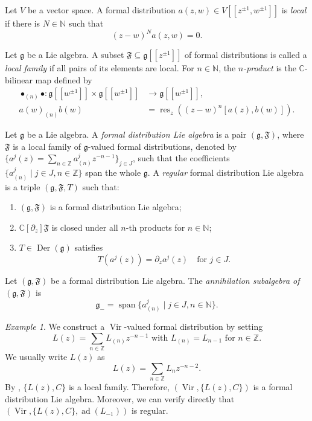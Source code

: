 \documentclass[a4paper, 12pt, reqno]{amsart}
\theoremstyle{remark}
\newtheorem{example}[theorem]{Example}
\DeclareMathOperator{\Vir}{Vir}
\DeclareMathOperator{\vspan}{span}
\DeclareMathOperator{\ad}{ad}
\DeclareMathOperator{\res}{res}
\DeclareMathOperator{\Der}{Der}
\begin{document}
Let $V$ be a vector space.
A formal distribution $a(z, w) \in V[[z^{\pm1}, w^{\pm1}]]$ is \emph{local} if there is $N \in \mathbb{N}$ such that
\begin{equation*}
  (z - w)^Na(z, w) = 0.
\end{equation*}

Let $\mathfrak{g}$ be a Lie algebra.
A subset $\mathfrak{F} \subseteq \mathfrak{g}[[z^{\pm1}]]$ of formal distributions is called a \emph{local family} if all pairs of its elements are local.
For $n \in \mathbb{N}$, the \emph{$n$-product} is the $\mathbb{C}$-bilinear map defined by
\begin{align*}
  \bullet_{(n)}\bullet: \mathfrak{g}[[w^{\pm1}]] \times \mathfrak{g}[[w^{\pm1}]] &\to \mathfrak{g}[[w^{\pm1}]], \\
  a(w)_{(n)}b(w) &= \res_z((z - w)^n[a(z), b(w)]).
\end{align*}

Let $\mathfrak{g}$ be a Lie algebra.
A \emph{formal distribution Lie algebra} is a pair $(\mathfrak{g}, \mathfrak{F})$, where $\mathfrak{F}$ is a local family of $\mathfrak{g}$-valued formal distributions, denoted by $\{a^j(z) = \sum_{n \in \mathbb{Z}}a^j_{(n)}z^{-n - 1}\}_{j \in J}$, such that the coefficients $\{a^j_{(n)} \mid j \in J, n \in \mathbb{Z}\}$ span the whole $\mathfrak{g}$.
A \emph{regular} formal distribution Lie algebra is a triple $(\mathfrak{g}, \mathfrak{F}, T)$ such that:
\begin{enumerate}
\item $(\mathfrak{g}, \mathfrak{F})$ is a formal distribution Lie algebra;
\item $\mathbb{C}[\partial_z]\mathfrak{F}$ is closed under all $n$-th products for $n \in \mathbb{N}$;
\item $T \in \Der(\mathfrak{g})$ satisfies
  \begin{equation*}
    T(a^j(z)) = \partial_za^j(z) \quad \text{for $j \in J$}.
  \end{equation*}
\end{enumerate}

Let $(\mathfrak{g}, \mathfrak{F})$ be a formal distribution Lie algebra.
The \emph{annihilation subalgebra of $(\mathfrak{g}, \mathfrak{F})$} is
\begin{equation*}
  \mathfrak{g}_- = \vspan\{a^j_{(n)} \mid j \in J, n \in \mathbb{N}\}.
\end{equation*}

\begin{example}
  \label{exa:7}
  We construct a $\Vir$-valued formal distribution by setting
  \begin{equation*}
    \text{$L(z) = \sum_{n \in \mathbb{Z}}L_{(n)}z^{-n - 1}$ with $L_{(n)} = L_{n - 1}$ for $n \in \mathbb{Z}$}.
  \end{equation*}
  We usually write $L(z)$ as
  \begin{equation*}
    L(z) = \sum_{n \in \mathbb{Z}}L_nz^{-n - 2}.
  \end{equation*}
  By \cite[\S2]{frenkel_vertex_2001}, $\{L(z), C\}$ is a local family.
  Therefore, $(\Vir, \{L(z), C\})$ is a formal distribution Lie algebra.
  Moreover, we can verify directly that $(\Vir, \{L(z), C\}, \ad(L_{-1}))$ is regular.
\end{example}
\end{document}
